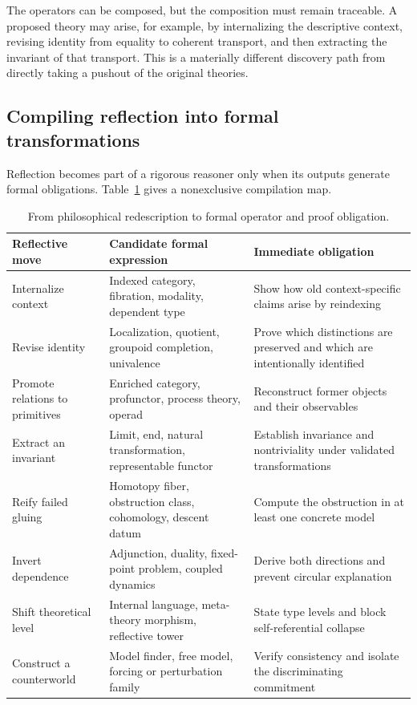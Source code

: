 \documentclass[11pt]{article}
\begin{document}
The operators can be composed, but the composition must remain traceable. A proposed theory may arise,
for example, by internalizing the descriptive context, revising identity from equality to coherent
transport, and then extracting the invariant of that transport. This is a materially different
discovery path from directly taking a pushout of the original theories.

\subsection{Compiling reflection into formal transformations}

Reflection becomes part of a rigorous reasoner only when its outputs generate formal obligations.
Table~\ref{tab:reflection-compilation} gives a nonexclusive compilation map.

\begin{table}[ht]
\centering
\small
\begin{tabularx}{\textwidth}{
>{\raggedright\arraybackslash}p{}
>{\raggedright\arraybackslash}p{}X}
\toprule
Reflective move & Candidate formal expression & Immediate obligation \\
\midrule
Internalize context & Indexed category, fibration, modality, dependent type & Show how old context-specific claims arise by reindexing \\
Revise identity & Localization, quotient, groupoid completion, univalence & Prove which distinctions are preserved and which are intentionally identified \\
Promote relations to primitives & Enriched category, profunctor, process theory, operad & Reconstruct former objects and their observables \\
Extract an invariant & Limit, end, natural transformation, representable functor & Establish invariance and nontriviality under validated transformations \\
Reify failed gluing & Homotopy fiber, obstruction class, cohomology, descent datum & Compute the obstruction in at least one concrete model \\
Invert dependence & Adjunction, duality, fixed-point problem, coupled dynamics & Derive both directions and prevent circular explanation \\
Shift theoretical level & Internal language, meta-theory morphism, reflective tower & State type levels and block self-referential collapse \\
Construct a counterworld & Model finder, free model, forcing or perturbation family & Verify consistency and isolate the discriminating commitment \\
\bottomrule
\end{tabularx}
\caption{From philosophical redescription to formal operator and proof obligation.}
\label{tab:reflection-compilation}
\end{table}
\end{document}
